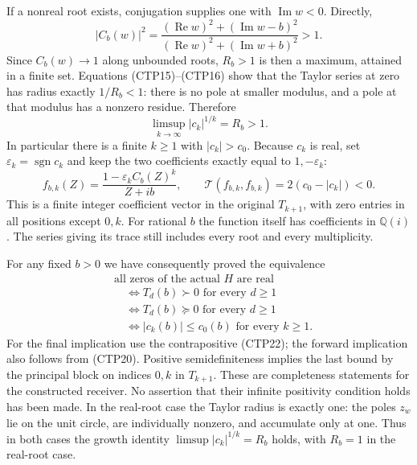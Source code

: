 If a nonreal root exists, conjugation supplies one with
$\operatorname{Im}w<0$. Directly,
\begin{equation}\tag{CTP21}
 |C_b(w)|^2=
 \frac{(\operatorname{Re}w)^2+(\operatorname{Im}w-b)^2}
      {(\operatorname{Re}w)^2+(\operatorname{Im}w+b)^2}>1.
\end{equation}
Since $C_b(w)\to1$ along unbounded roots, $R_b>1$ is then a
maximum, attained in a finite set. Equations (CTP15)--(CTP16) show
that the Taylor series at zero has radius exactly $1/R_b<1$:
there is no pole at smaller modulus, and a pole at that modulus
has a nonzero residue. Therefore
\begin{equation}\tag{CTP22}
 \limsup_{k\to\infty}|c_k|^{1/k}=R_b>1.
\end{equation}
In particular there is a finite $k\ge1$ with $|c_k|>c_0$.
Because $c_k$ is real, set $\varepsilon_k=\operatorname{sgn}c_k$
and keep the two coefficients exactly equal to $1,-\varepsilon_k$:
\begin{equation}\tag{CTP23}
 f_{b,k}(Z)=\frac{1-\varepsilon_kC_b(Z)^k}{Z+ib},\qquad
 \mathcal T(f_{b,k},f_{b,k})=2(c_0-|c_k|)<0.
\end{equation}
This is a finite integer coefficient vector in the original
$T_{k+1}$, with zero entries in all positions except $0,k$.
For rational $b$ the function itself has coefficients in
$\mathbb Q(i)$. The series giving its trace still includes every
root and every multiplicity.

For any fixed $b>0$ we have consequently proved the equivalence
\begin{equation}\tag{CTP24}
\begin{aligned}
 &\text{all zeros of the actual }H\text{ are real}\\
 &\quad\Longleftrightarrow T_d(b)\succ0\text{ for every }d\ge1\\
 &\quad\Longleftrightarrow T_d(b)\succeq0\text{ for every }d\ge1\\
 &\quad\Longleftrightarrow |c_k(b)|\le c_0(b)\text{ for every }k\ge1.
\end{aligned}
\end{equation}
For the final implication use the contrapositive (CTP22); the
forward implication also follows from (CTP20). Positive
semidefiniteness implies the last bound by the principal block on
indices $0,k$ in $T_{k+1}$. These are completeness statements for
the constructed receiver. No assertion that their infinite
positivity condition holds has been made. In the real-root case
the Taylor radius is exactly one: the poles $z_w$ lie on the unit
circle, are individually nonzero, and accumulate only at one.
Thus in both cases the growth identity
$\limsup|c_k|^{1/k}=R_b$ holds, with $R_b=1$ in the real-root case.

